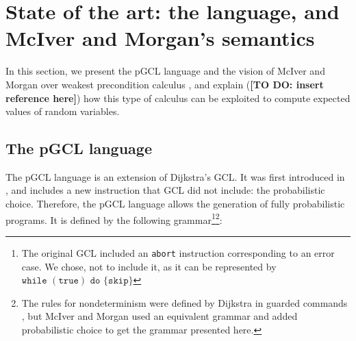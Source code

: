 \documentclass[a4paper,10pt]{llncs}
\newcommand\todo[1]{{\color{red}\textbf{[TO DO:  #1]}}}
\begin{document}
%
	
\section{State of the art: the language, and McIver and Morgan's semantics}
\label{sec:state}
In this section, we present the pGCL language and the vision of McIver and Morgan over weakest precondition calculus \cite{McIver05}, and explain (\todo{insert reference here}) how this type of calculus can be exploited to compute expected values of random variables.
	\subsection{The pGCL language}
	The pGCL language is an extension of Dijkstra's GCL. It was first introduced in \cite{McIver05}, and includes a new instruction that GCL did not include: the probabilistic choice. Therefore, the pGCL language allows the generation of fully probabilistic programs. It is defined by the following grammar\footnote{The original GCL included an \texttt{abort} instruction corresponding to an error case. We chose, not to include it, as it can be represented by $\texttt{while } (\texttt{true}) \texttt{ do }\{ \texttt{skip} \}$}\footnote{The rules for nondeterminism were defined by Dijkstra in guarded commands \cite{Dijkstra76}, but McIver and Morgan used an equivalent grammar and added probabilistic choice to get the grammar presented here. }:\bigskip
\end{document}
